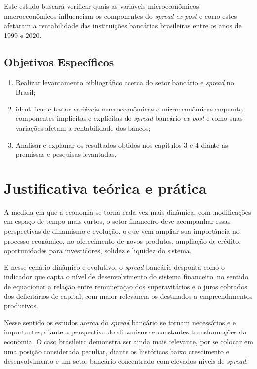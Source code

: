 \documentclass[12pt,openright,oneside,a4paper,chapter=TITLE,section=TITLE,subsection=TITLE,english,french,spanish,portugues,sumario=tradicional]{abntex2}
\providecommand{\tightlist}{%
  \setlength{\itemsep}{0pt}\setlength{\parskip}{0pt}}
\begin{document}
Este estudo buscará verificar quais as variáveis microeconômicos macroeconômicos influenciam os componentes do \emph{spread} \emph{ex-post} e como estes afetaram a rentabilidade das instituições bancárias brasileiras entre os anos de 1999 e 2020.

\subsection{Objetivos Específicos}

\begin{enumerate}
\def\labelenumi{\arabic{enumi}.}
\tightlist
\item
  Realizar levantamento bibliográfico acerca do setor bancário e \emph{spread} no Brasil;
\item
  identificar e testar variáveis macroeconômicas e microeconômicas enquanto componentes implícitas e explícitas do \emph{spread} bancário \emph{ex-post} e como suas variações afetam a rentabilidade dos bancos;
\item
  Analisar e explanar os resultados obtidos nos capítulos 3 e 4 diante as premissas e pesquisas levantadas.
\end{enumerate}

\section{Justificativa teórica e prática}

A medida em que a economia se torna cada vez mais dinâmica, com modificações em
espaço de tempo mais curtos, o setor financeiro deve acompanhar essas
perspectivas de dinamismo e evolução, o que vem ampliar sua importância no
processo econômico, no oferecimento de novos produtos, ampliação de crédito, oportunidades para investidores, solidez e liquidez do sistema.

E nesse cenário dinâmico e evolutivo, o \emph{spread} bancário desponta como o
indicador que capta o nível de desenvolvimento do sistema financeiro, no
sentido de equacionar a relação entre remuneração dos superavitários e o juros
cobrados dos deficitários de capital, com maior relevância os destinados a empreendimentos produtivos.

Nesse sentido os estudos acerca do \emph{spread} bancário se tornam necessários e
e importantes, diante a perspectiva do dinamismo e constantes transformações da economia. O caso brasileiro demonstra ser ainda mais relevante, por se colocar em uma posição considerada peculiar, diante os históricos baixo crescimento e desenvolvimento e um setor bancário concentrado com elevados níveis de \emph{spread}.
\end{document}
